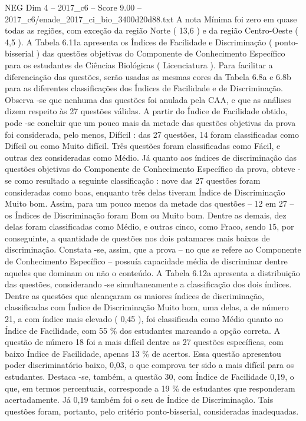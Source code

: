 \begin{textsample}{NEG Dim 4 – 2017\_c6 – Score 9.00 – 2017\_c6/enade\_2017\_ci\_bio\_3400d20d88.txt}
A nota Mínima foi zero em quase todas as regiões, com exceção da região Norte ( 13,6 ) e da região Centro-Oeste ( 4,5 ).
A Tabela 6.11a apresenta os Índices de Facilidade e Discriminação ( ponto-bisserial ) das questões objetivas do Componente de Conhecimento Específico para os estudantes de Ciências Biológicas ( Licenciatura ).
Para facilitar a diferenciação das questões, serão usadas as mesmas cores da Tabela 6.8a e 6.8b para as diferentes classificações dos Índices de Facilidade e de Discriminação.
Observa -se que nenhuma das questões foi anulada pela CAA, e que as análises dizem respeito às 27 questões válidas.
A partir do Índice de Facilidade obtido, pode -se concluir que um pouco mais da metade das questões objetivas da prova foi considerada, pelo menos, Difícil : das 27 questões, 14 foram classificadas como Difícil ou como Muito difícil.
Três questões foram classificadas como Fácil, e outras dez consideradas como Médio.
Já quanto aos índices de discriminação das questões objetivas do Componente de Conhecimento Específico da prova, obteve -se como resultado a seguinte classificação : nove das 27 questões foram consideradas como boas, enquanto três delas tiveram Índice de Discriminação Muito bom.
Assim, para um pouco menos da metade das questões – 12 em 27 – os Índices de Discriminação foram Bom ou Muito bom.
Dentre as demais, dez delas foram classificadas como Médio, e outras cinco, como Fraco, sendo 15, por conseguinte, a quantidade de questões nos dois patamares mais baixos de discriminação.
Constata -se, assim, que a prova – no que se refere ao Componente de Conhecimento Específico – possuía capacidade média de discriminar dentre aqueles que dominam ou não o conteúdo.
A Tabela 6.12a apresenta a distribuição das questões, considerando -se simultaneamente a classificação dos dois índices.
Dentre as questões que alcançaram os maiores índices de discriminação, classificadas com Índice de Discriminação Muito bom, uma delas, a de número 21, a com índice mais elevado ( 0,45 ), foi classificada como Médio quanto ao Índice de Facilidade, com 55 \% dos estudantes marcando a opção correta.
A questão de número 18 foi a mais difícil dentre as 27 questões específicas, com baixo Índice de Facilidade, apenas 13 \% de acertos.
Essa questão apresentou poder discriminatório baixo, 0,03, o que comprova ter sido a mais difícil para os estudantes.
Destaca -se, também, a questão 30, com Índice de Facilidade 0,19, o que, em termos percentuais, corresponde a 19 \% de estudantes que responderam acertadamente.
Já 0,19 também foi o seu de Índice de Discriminação.
Tais questões foram, portanto, pelo critério ponto-bisserial, consideradas inadequadas.

\end{textsample}

